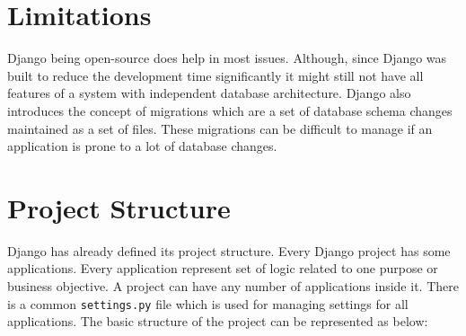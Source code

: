 \section{Limitations}
Django being open-source does help in most issues. Although, since Django was
built to reduce the development time significantly it might still not have
all features of a system with independent database architecture. Django also
introduces the concept of migrations which are a set of database schema changes
maintained as a set of files. These migrations can be difficult to manage if
an application is prone to a lot of database changes.

\section{Project Structure}
Django has already defined its project structure. Every Django project has some
applications. Every application represent set of logic related to one purpose
or business objective. A project can have any number of applications inside
it. There is a common \texttt{settings.py} file which is used for managing
settings for all applications. The basic structure of the project can be
represented as below:

